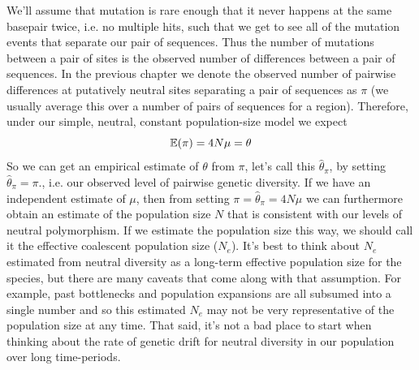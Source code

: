 %
We'll assume that mutation is rare enough that it never happens at the same basepair twice, i.e. no multiple hits, such that we get to see all of the mutation events that separate our pair
of sequences.  Thus the number of
mutations between a pair of sites is the observed number of
differences between a pair of sequences. In the previous chapter we denote the observed number of pairwise differences at putatively neutral
sites separating a pair of sequences as $\pi$ (we usually average this over a
number of pairs of sequences for a region). Therefore, under our simple, neutral, constant population-size model we expect
\begin{equation}
\mathbb{E}(\pi) = 4 N \mu = \theta
\end{equation}
So we can get an empirical estimate of $\theta$ from
$\pi$, let's call this $\widehat{\theta}_{\pi}$, by setting $\widehat{\theta}_{\pi}=\pi$., i.e. our observed level of pairwise genetic diversity.  If we
have an independent estimate of $\mu$, then from setting $\pi =\widehat{\theta}_{\pi} = 4N\mu$ we can furthermore obtain an estimate of the population
size $N$ that is consistent with our levels of neutral polymorphism. If we estimate the population size this way, we should call it the effective coalescent population size ($N_e$). It's best to think about $N_{e}$ estimated from neutral diversity as a long-term effective population size for the species, but there are many caveats that come along with that assumption. For example, past bottlenecks and population expansions are all subsumed into a single number and so this estimated $N_{e}$ may not be very representative of the population size at any time. That said, it's not a bad place to start when thinking about the rate of genetic drift for neutral diversity in our population over long time-periods. 

